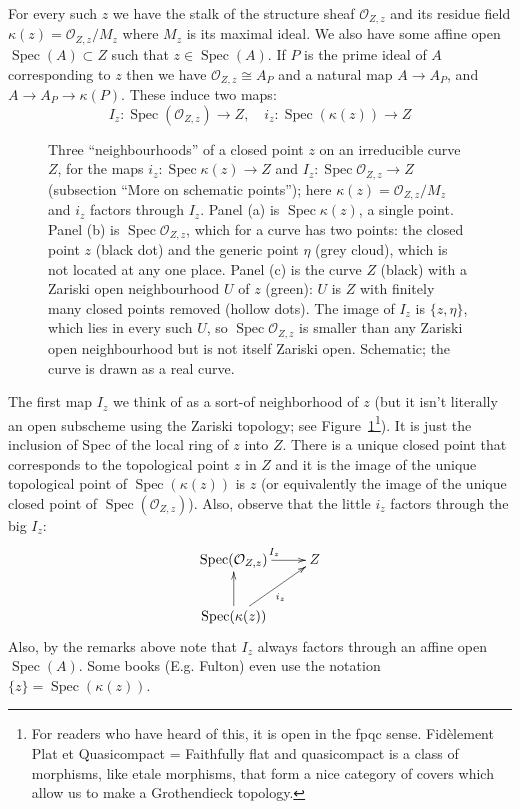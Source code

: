 \documentclass[12pt]{article}
\numberwithin{equation}{section}
\theoremstyle{definition}
\theoremstyle{remark}
\newcommand{\Ocal}{\mathcal{O}}
\newcommand{\Spec}{\operatorname{Spec}}
\begin{document}
For every such $z$ we have the stalk of the structure sheaf $\Ocal_{Z,z}$ and its residue field $\kappa(z) = \Ocal_{Z,z}/M_z$ where $M_z$ is its maximal ideal. 
We also have some affine open $\Spec(A) \subset Z$ such that $z \in \Spec(A)$. 
If $P$ is the prime ideal of $A$ corresponding to $z$ then we have $\Ocal_{Z,z}\cong A_{P}$ and a natural map $A\to A_P$, and $A\to A_P \to \kappa(P)$. 
These induce two maps:
$$ I_z: \Spec(\Ocal_{Z,z}) \to Z, \quad i_z: \Spec(\kappa(z)) \to Z$$
\begin{figure}[H]
\centering

\caption{Three ``neighbourhoods'' of a closed point $z$ on an irreducible curve $Z$, for the maps $i_z:\Spec\kappa(z)\to Z$ and $I_z:\Spec\Ocal_{Z,z}\to Z$ (subsection ``More on schematic points''); here $\kappa(z)=\Ocal_{Z,z}/M_z$ and $i_z$ factors through $I_z$. Panel (a) is $\Spec\kappa(z)$, a single point. Panel (b) is $\Spec\Ocal_{Z,z}$, which for a curve has two points: the closed point $z$ (black dot) and the generic point $\eta$ (grey cloud), which is not located at any one place. Panel (c) is the curve $Z$ (black) with a Zariski open neighbourhood $U$ of $z$ (green): $U$ is $Z$ with finitely many closed points removed (hollow dots). The image of $I_z$ is $\{z,\eta\}$, which lies in every such $U$, so $\Spec\Ocal_{Z,z}$ is smaller than any Zariski open neighbourhood but is not itself Zariski open. Schematic; the curve is drawn as a real curve.}\label{fig:schematic-points}
\end{figure}

The first map $I_z$ we think of as a sort-of neighborhood of $z$ (but it isn't literally an open subscheme using the Zariski topology; see Figure~\ref{fig:schematic-points}\footnote{For readers who have heard of this, it is open in the fpqc sense. Fid\`element Plat et Quasicompact = Faithfully flat and quasicompact is a class of morphisms, like etale morphisms, that form a nice category of covers which allow us to make a Grothendieck topology.}). 
It is just the inclusion of Spec of the local ring of $z$ into $Z$. 
There is a unique closed point that corresponds to the topological point $z$ in $Z$ and it is the image of the unique topological point of $\Spec(\kappa(z))$ is $z$ (or equivalently the image of the unique closed point of $\Spec(\Ocal_{Z,z})$). 
Also, observe that the little $i_z$ factors through the big $I_z$:
$$\xymatrix{
	\Spec(\Ocal_{Z,z}) \ar[r]^{I_z} & Z \\
	\Spec(\kappa(z))\ar[u] \ar[ur]_{i_z} & 
}$$
Also, by the remarks above note that $I_z$ always factors through an affine open $\Spec(A)$.
Some books (E.g. Fulton) even use the notation $\lbrace z \rbrace = \Spec(\kappa(z))$.
\end{document}
